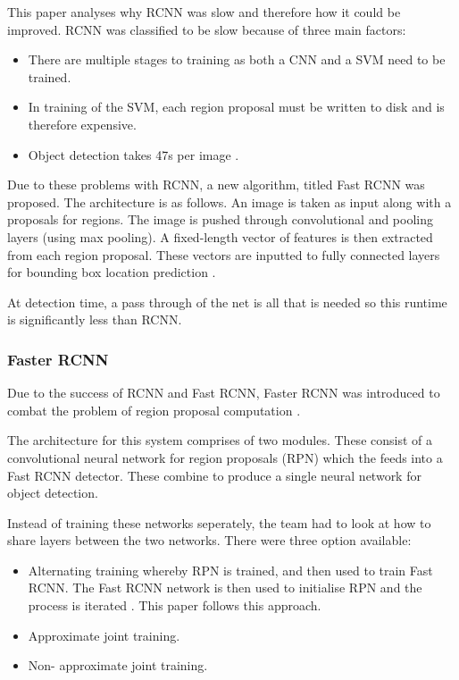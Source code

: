 This paper analyses why RCNN \textcite{rcnn} was slow and therefore how it could be improved.
RCNN was classified to be slow because of three main factors:
\begin{itemize}
	\item{There are multiple stages to training as both a CNN and a SVM need to
		be trained.}
	\item{In training of the SVM, each region proposal must be written to disk
		and is therefore expensive.}
	\item{Object detection takes 47s per image \textcite{fastRcnn}.}
\end{itemize}

Due to these problems with RCNN, a new algorithm, titled Fast RCNN was proposed.
The architecture is as follows. An image is taken as input along with a
proposals for regions. The image is pushed through convolutional and pooling
layers (using max pooling). A fixed-length vector of features is then extracted
from each region proposal. These vectors are inputted to fully connected
layers for bounding box location prediction \textcite{fastRcnn}.

At detection time, a pass through of the net is all that is needed so this
runtime is significantly less than RCNN.

\subsubsection*{Faster RCNN}
Due to the success of RCNN and Fast RCNN, Faster RCNN was introduced to combat
the problem of region proposal computation \textcite{fasterRcnn}.

The architecture for this system comprises of two modules. These consist of a
convolutional neural network for region proposals (RPN) which the feeds into a Fast
RCNN detector. These combine to produce a single neural network for object
detection.

Instead of training these networks seperately, the team had to look at how to
share layers between the two networks. There were three option available:
\begin{itemize}
    \item{Alternating training whereby RPN is trained, and then used to train
        Fast RCNN. The Fast RCNN network is then used to initialise RPN and the
		process is iterated \textcite{fasterRcnn}. This paper follows this approach.}
    \item{Approximate joint training.}
    \item{Non- approximate joint training.}
\end{itemize}

